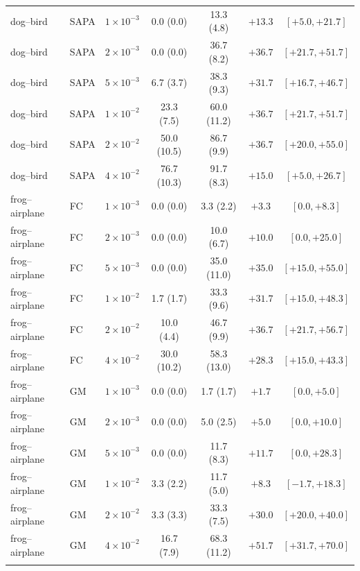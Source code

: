 \begin{table}[p]
\begin{tabular}{llccccc}
dog--bird & SAPA & $1{\times}10^{-3}$ & 0.0 (0.0) & 13.3 (4.8) & $+13.3$ & $[+5.0, +21.7]$ \\
dog--bird & SAPA & $2{\times}10^{-3}$ & 0.0 (0.0) & 36.7 (8.2) & $+36.7$ & $[+21.7, +51.7]$ \\
dog--bird & SAPA & $5{\times}10^{-3}$ & 6.7 (3.7) & 38.3 (9.3) & $+31.7$ & $[+16.7, +46.7]$ \\
dog--bird & SAPA & $1{\times}10^{-2}$ & 23.3 (7.5) & 60.0 (11.2) & $+36.7$ & $[+21.7, +51.7]$ \\
dog--bird & SAPA & $2{\times}10^{-2}$ & 50.0 (10.5) & 86.7 (9.9) & $+36.7$ & $[+20.0, +55.0]$ \\
dog--bird & SAPA & $4{\times}10^{-2}$ & 76.7 (10.3) & 91.7 (8.3) & $+15.0$ & $[+5.0, +26.7]$ \\

\midrule

frog--airplane & FC & $1{\times}10^{-3}$ & 0.0 (0.0) & 3.3 (2.2) & $+3.3$ & $[0.0, +8.3]$ \\
frog--airplane & FC & $2{\times}10^{-3}$ & 0.0 (0.0) & 10.0 (6.7) & $+10.0$ & $[0.0, +25.0]$ \\
frog--airplane & FC & $5{\times}10^{-3}$ & 0.0 (0.0) & 35.0 (11.0) & $+35.0$ & $[+15.0, +55.0]$ \\
frog--airplane & FC & $1{\times}10^{-2}$ & 1.7 (1.7) & 33.3 (9.6) & $+31.7$ & $[+15.0, +48.3]$ \\
frog--airplane & FC & $2{\times}10^{-2}$ & 10.0 (4.4) & 46.7 (9.9) & $+36.7$ & $[+21.7, +56.7]$ \\
frog--airplane & FC & $4{\times}10^{-2}$ & 30.0 (10.2) & 58.3 (13.0) & $+28.3$ & $[+15.0, +43.3]$ \\
\addlinespace[2pt]

frog--airplane & GM & $1{\times}10^{-3}$ & 0.0 (0.0) & 1.7 (1.7) & $+1.7$ & $[0.0, +5.0]$ \\
frog--airplane & GM & $2{\times}10^{-3}$ & 0.0 (0.0) & 5.0 (2.5) & $+5.0$ & $[0.0, +10.0]$ \\
frog--airplane & GM & $5{\times}10^{-3}$ & 0.0 (0.0) & 11.7 (8.3) & $+11.7$ & $[0.0, +28.3]$ \\
frog--airplane & GM & $1{\times}10^{-2}$ & 3.3 (2.2) & 11.7 (5.0) & $+8.3$ & $[-1.7, +18.3]$ \\
frog--airplane & GM & $2{\times}10^{-2}$ & 3.3 (3.3) & 33.3 (7.5) & $+30.0$ & $[+20.0, +40.0]$ \\
frog--airplane & GM & $4{\times}10^{-2}$ & 16.7 (7.9) & 68.3 (11.2) & $+51.7$ & $[+31.7, +70.0]$ \\
\addlinespace[2pt]


\end{tabular}
\end{table}
